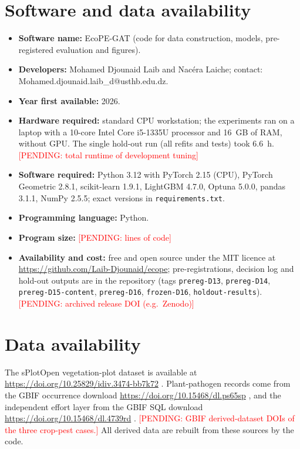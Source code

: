 \documentclass[a4paper,fleqn]{cas-sc}
\newcommand{\pending}[1]{\textcolor{red}{[PENDING: #1]}}
\begin{document}
\section*{Software and data availability}
\begin{itemize}[leftmargin=1.4em]
  \item \textbf{Software name:} EcoPE-GAT (code for data construction, models, pre-registered evaluation and figures).
  \item \textbf{Developers:} Mohamed Djounaid Laib and Nacéra Laiche; contact: Mohamed.djounaid.laib\_d@usthb.edu.dz.
  \item \textbf{Year first available:} 2026.
  \item \textbf{Hardware required:} standard CPU workstation; the experiments ran on a laptop with a 10-core Intel Core i5-1335U processor and 16~GB of RAM, without GPU. The single hold-out run (all refits and tests) took 6.6~h. \pending{total runtime of development tuning}
  \item \textbf{Software required:} Python 3.12 with PyTorch 2.15 (CPU), PyTorch Geometric 2.8.1, scikit-learn 1.9.1, LightGBM 4.7.0, Optuna 5.0.0, pandas 3.1.1, NumPy 2.5.5; exact versions in \texttt{requirements.txt}.
  \item \textbf{Programming language:} Python.
  \item \textbf{Program size:} \pending{lines of code}
  \item \textbf{Availability and cost:} free and open source under the MIT licence at \url{https://github.com/Laib-Djounaid/ecope}; pre-registrations, decision log and hold-out outputs are in the repository (tags \texttt{prereg-D13}, \texttt{prereg-D14}, \texttt{prereg-D15-content}, \texttt{prereg-D16}, \texttt{frozen-D16}, \texttt{holdout-results}). \pending{archived release DOI (e.g.\ Zenodo)}
\end{itemize}

\section*{Data availability}
The sPlotOpen vegetation-plot dataset is available at \url{https://doi.org/10.25829/idiv.3474-bb7k72} \citep{splotdata}. Plant-pathogen records come from the GBIF occurrence download \url{https://doi.org/10.15468/dl.ps65sp} \citep{gbifdownload}, and the independent effort layer from the GBIF SQL download \url{https://doi.org/10.15468/dl.4739rd} \citep{gbifeffort}. \pending{GBIF derived-dataset DOIs of the three crop-pest cases.} All derived data are rebuilt from these sources by the code.
\end{document}

